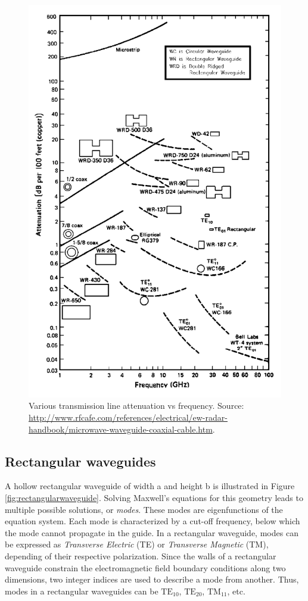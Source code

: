 \begin{figure}
\centering
\includegraphics[width=0.9\linewidth]{Figures/LHCD/RFCafe_TL_attenuations}
\caption{Various transmission line attenuation vs frequency. Source: \url{http://www.rfcafe.com/references/electrical/ew-radar-handbook/microwave-waveguide-coaxial-cable.htm}.}
\label{fig:rfcafetlattenuations}
\end{figure}


\subsection{Rectangular waveguides} 
A hollow rectangular waveguide of width a and height b is illustrated in Figure \ref{fig:rectangularwaveguide}. Solving Maxwell’s equations for this geometry leads to multiple possible solutions, or \emph{modes}. These modes are eigenfunctions of the equation system. Each mode is characterized by a cut-off frequency, below which the mode cannot propagate in the guide. In a rectangular waveguide, modes can be expressed as \emph{Transverse Electric} (TE) or \emph{Transverse Magnetic} (TM), depending of their respective polarization. Since the walls of a rectangular waveguide constrain the electromagnetic field boundary conditions along two dimensions, two integer indices are used to describe a mode from another. Thus, modes in a rectangular waveguides can be $\mathrm{TE}_{10}$, $\mathrm{TE}_{20}$, $\mathrm{TM}_{11}$, etc. 


